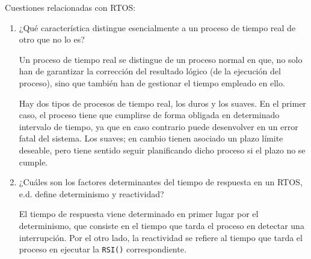\begin{ejercicio}
    Cuestiones relacionadas con RTOS:
    \begin{enumerate}
        \item ¿Qué característica distingue esencialmente a un proceso de tiempo real de otro que no lo es?

        Un proceso de tiempo real se distingue de un proceso normal en que, no solo han de garantizar la corrección del resultado lógico (de la ejecución del proceso), sino que también han de gestionar el tiempo empleado en ello.

        Hay dos tipos de procesos de tiempo real, los duros y los suaves. En el primer caso, el proceso tiene que cumplirse de forma obligada en determinado intervalo de tiempo, ya que en caso contrario puede desenvolver en un error fatal del sistema. Los suaves; en cambio tienen asociado un plazo límite deseable, pero tiene sentido seguir planificando dicho proceso si el plazo no se cumple.

        \item ¿Cuáles son los factores determinantes del tiempo de respuesta en un RTOS, e.d. define determinismo y reactividad?

        El tiempo de respuesta viene determinado en primer lugar por el determinismo, que consiste en el tiempo que tarda el proceso en detectar una interrupción. Por el otro lado, la reactividad se refiere al tiempo que tarda el proceso en ejecutar la \verb|RSI()| correspondiente.
    \end{enumerate}
\end{ejercicio}
